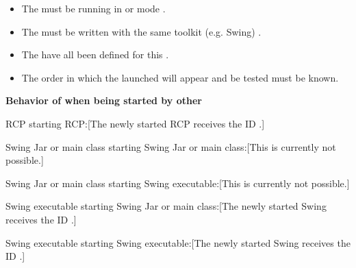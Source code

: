 \begin{itemize}
\item The \gdagent{} must be running in  or  mode .
\item The \gdauts{} must be written with the same toolkit (e.g. Swing) .
\item The \gdauts{} have all been defined for this .
\item The order in which the launched \gdauts{} will appear and be tested must be known.
\end{itemize}

\textbf{Behavior of \gdauts{} when being started by other \gdauts{}}\\
\begin{description}
\item {RCP starting RCP:}[The newly started RCP \gdaut{} receives the ID .]
\item {Swing Jar or main class starting Swing Jar or main class:}[This is currently not possible.]
\item {Swing Jar or main class starting Swing executable:}[This is currently not possible.]
\item {Swing executable starting Swing Jar or main class:}[The newly started Swing \gdaut{} receives the ID .]
\item {Swing executable starting Swing executable:}[The newly started Swing \gdaut{} receives the ID .]
\end{description}

